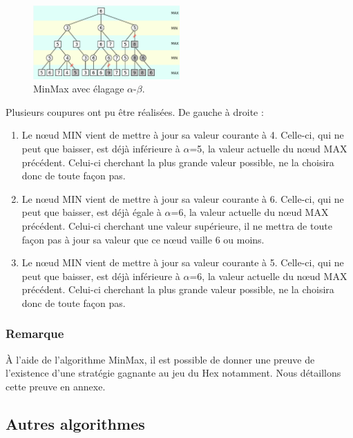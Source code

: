 \begin{figure}[h]
    \begin{center}
        \includegraphics[width=0.5\textwidth]{root/minmax_alpha_beta.png}
    \end{center}
    \caption{MinMax avec élagage $\alpha$-$\beta$.}\label{fig:min_max_alpha_beta}
\end{figure}


Plusieurs coupures ont pu être réalisées. De gauche à droite :
\begin{enumerate}
    \item Le nœud MIN vient de mettre à jour sa valeur courante à 4. Celle-ci, qui ne peut que baisser, est déjà inférieure à $\alpha$=5, 
    la valeur actuelle du nœud MAX précédent. Celui-ci cherchant la plus grande valeur possible, ne la choisira donc de toute façon pas.
    \item Le nœud MIN vient de mettre à jour sa valeur courante à 6. Celle-ci, qui ne peut que baisser, est déjà égale à $\alpha$=6, la valeur 
    actuelle du nœud MAX précédent. Celui-ci cherchant une valeur supérieure, il ne mettra de toute façon pas à jour sa valeur que ce nœud 
    vaille 6 ou moins.
    \item Le nœud MIN vient de mettre à jour sa valeur courante à 5. Celle-ci, qui ne peut que baisser, est déjà inférieure à $\alpha$=6, la valeur 
    actuelle du nœud MAX précédent. Celui-ci cherchant la plus grande valeur possible, ne la choisira donc de toute façon pas.
\end{enumerate}

\subsubsection{Remarque}
À l'aide de l'algorithme MinMax, il est possible de donner une preuve de l'existence d'une stratégie gagnante au jeu du Hex notamment. Nous détaillons
cette preuve en annexe.

\subsection{Autres algorithmes}
